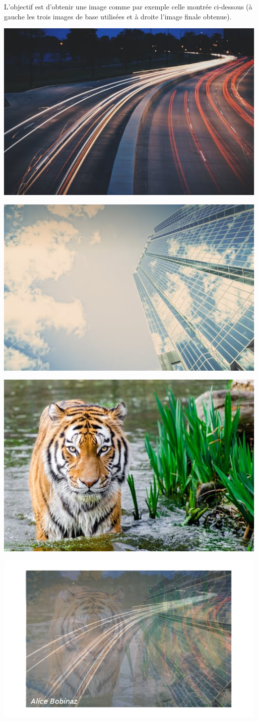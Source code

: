 L'objectif est d'obtenir une image comme par exemple celle montrée ci-dessous (à gauche les trois images de base utilisées et à droite l'image finale obtenue).

\vspace{12pt}

\begin{minipage}[c]{.38\textwidth}
\begin{center}
\includegraphics[angle=0,width=.4\textwidth]{./sources/image02/seanceArts/01_Road}

\vspace{4pt}

\includegraphics[angle=0,width=.4\textwidth]{./sources/image02/seanceArts/02_Tower}

\vspace{4pt}

\includegraphics[angle=0,width=.4\textwidth]{./sources/image02/seanceArts/03_Tiger}
\end{center}
\end{minipage}\hfill%
\begin{minipage}[c]{.6\textwidth}
\centering%
\includegraphics[angle=0,width=.85\textwidth]{./sources/image02/seanceArts/seanceArts5e}
\end{minipage}

